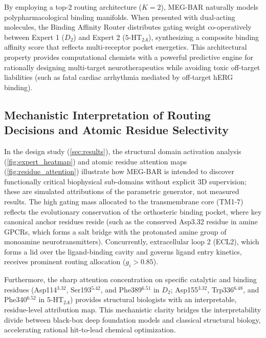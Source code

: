 \documentclass{article}
\theoremstyle{definition}
\begin{document}
By employing a top-$2$ routing architecture ($K=2$), MEG-BAR naturally models polypharmacological binding manifolds. When presented with dual-acting molecules, the Binding Affinity Router distributes gating weight co-operatively between Expert 1 ($D_2$) and Expert 2 ($5\text{-HT}_{2A}$), synthesizing a composite binding affinity score that reflects multi-receptor pocket energetics. This architectural property provides computational chemists with a powerful predictive engine for rationally designing multi-target neurotherapeutics while avoiding toxic off-target liabilities (such as fatal cardiac arrhythmia mediated by off-target hERG binding).

\subsection{Mechanistic Interpretation of Routing Decisions and Atomic Residue Selectivity}
In the design study (\cref{sec:results}), the structural domain activation analysis (\cref{fig:expert_heatmap}) and atomic residue attention maps (\cref{fig:residue_attention}) illustrate how MEG-BAR is intended to discover functionally critical biophysical sub-domains without explicit 3D supervision; these are simulated attributions of the parametric generator, not measured results. The high gating mass allocated to the transmembrane core (TM1-7) reflects the evolutionary conservation of the orthosteric binding pocket, where key canonical anchor residues reside (such as the conserved Asp3.32 residue in amine GPCRs, which forms a salt bridge with the protonated amine group of monoamine neurotransmitters). Concurrently, extracellular loop 2 (ECL2), which forms a lid over the ligand-binding cavity and governs ligand entry kinetics, receives prominent routing allocation ($g_i > 0.85$). 

Furthermore, the sharp attention concentration on specific catalytic and binding residues (Asp114$^{3.32}$, Ser193$^{5.42}$, and Phe389$^{6.51}$ in $D_2$; Asp155$^{3.32}$, Trp336$^{6.48}$, and Phe340$^{6.52}$ in $5\text{-HT}_{2A}$) provides structural biologists with an interpretable, residue-level attribution map. This mechanistic clarity bridges the interpretability divide between black-box deep foundation models and classical structural biology, accelerating rational hit-to-lead chemical optimization.
\end{document}
